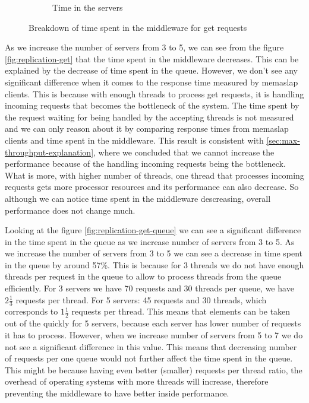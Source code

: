 \documentclass[11pt]{article}
\begin{document}
\begin{figure}
\begin{subfigure}{.5\textwidth}
	\caption{Time in the servers}
	\label{fig:replication-get-servers}
\end{subfigure}
\caption{Breakdown of time spent in the middleware for get requests}
\label{fig:replication-get-breakdown}
\end{figure}

As we increase the number of servers from 3 to 5, we can see from the figure \ref{fig:replication-get} that the time spent in the middleware decreases. This can be explained by the decrease of time spent in the queue. However, we don't see any significant difference when it comes to the response time measured by memaslap clients. This is because with enough threads to process get requests, it is handling incoming requests that becomes the bottleneck of the system. The time spent by the request waiting for being handled by the accepting threads is not measured and we can only reason about it by comparing response times from memaslap clients and time spent in the middleware. This result is consistent with \ref{sec:max-throughput-explanation}, where we concluded that we cannot increase the performance because of the handling incoming requests being the bottleneck. What is more, with higher number of threads, one thread that processes incoming requests gets more processor resources and its performance can also decrease. So although we can notice time spent in the middleware descreasing, overall performance does not change much. 

Looking at the figure \ref{fig:replication-get-queue} we can see a significant difference in the time spent in the queue as we increase number of servers from 3 to 5. As we increase the number of servers from 3 to 5 we can see a decrease in time spent in the queue by around 57\%. This is because for 3 threads we do not have enough threads per request in the queue to allow to process threads from the queue efficiently. For 3 servers we have 70 requests and 30 threads per queue, we have $2\frac{1}{3}$ requests per thread. For 5 servers: 45 requests and 30 threads, which corresponds to $1\frac{1}{2}$ requests per thread. This means that elements can be taken out of the quickly for 5 servers, because each server has lower number of requests it has to process. However, when we increase number of servers from 5 to 7 we do not see a significant difference in this value. This means that decreasing number of requests per one queue would not further affect the time spent in the queue. This might be because having even better (smaller) requests per thread ratio, the overhead of operating systems with more threads will increase, therefore preventing the middleware to have better inside performance.
\end{document}
